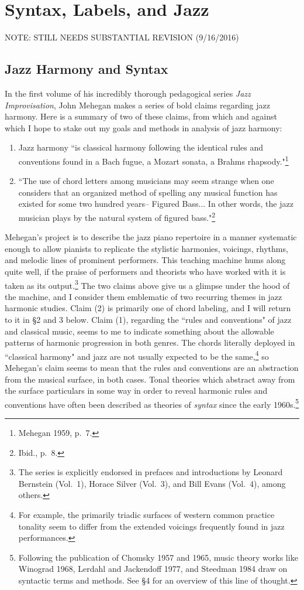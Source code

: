 \chapter{Syntax, Labels, and Jazz}

NOTE: STILL NEEDS SUBSTANTIAL REVISION (9/16/2016)

\section{Jazz Harmony and Syntax}
In the first volume of his incredibly thorough pedagogical series \emph{Jazz Improvisation}, John Mehegan makes a series of bold claims regarding jazz harmony.  Here is a summary of two of these claims, from which and against which I hope to stake out my goals and methods in analysis of jazz harmony:
\begin{enumerate}
	\item Jazz harmony ``is classical harmony following the identical rules and conventions found in a Bach fugue, a Mozart sonata, a Brahms rhapsody."\footnote{Mehegan 1959, p.\ 7.}
	\item ``The use of chord letters among musicians may seem strange when one considers that an organized method of spelling any musical function has existed for some two hundred years-- Figured Bass... In other words, the jazz musician plays by the natural system of figured bass."\footnote{Ibid., p.\ 8.}
\end{enumerate}
Mehegan's project is to describe the jazz piano repertoire in a manner systematic enough to allow pianists to replicate the stylistic harmonies, voicings, rhythms, and melodic lines of prominent performers.  This teaching machine hums along quite well, if the praise of performers and theorists who have worked with it is taken as its output.\footnote{The series is explicitly endorsed in prefaces and introductions by Leonard Bernstein (Vol.\ 1), Horace Silver (Vol.\ 3), and Bill Evans (Vol.\ 4), among others.}  The two claims above give us a glimpse under the hood of the machine, and I consider them emblematic of two recurring themes in jazz harmonic studies.  Claim (2) is primarily one of chord labeling, and I will return to it in \S 2 and 3 below.  Claim (1), regarding the ``rules and conventions" of jazz and classical music, seems to me to indicate something about the allowable patterns of harmonic progression in both genres.  The chords literally deployed in ``classical harmony" and jazz are not usually expected to be the same,\footnote{For example, the primarily triadic surfaces of western common practice tonality seem to differ from the extended voicings frequently found in jazz performances.} so Mehegan's claim seems to mean that the rules and conventions are an abstraction from the musical surface, in both cases.  Tonal theories which abstract away from the surface particulars in some way in order to reveal harmonic rules and conventions have often been described as theories of \emph{syntax} since the early 1960s.\footnote{Following the publication of Chomsky 1957 and 1965, music theory works like Winograd 1968, Lerdahl and Jackendoff 1977, and Steedman 1984 draw on syntactic terms and methods.  See \S 4 for an overview of this line of thought.}

